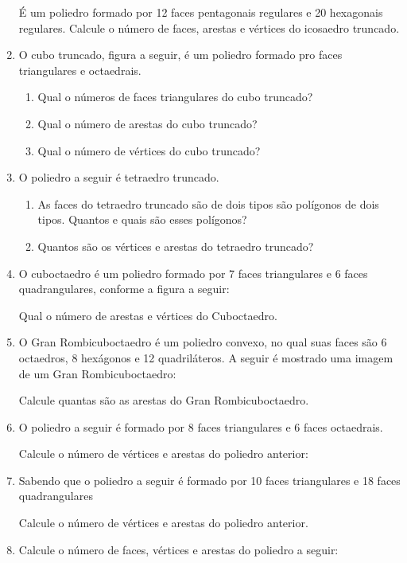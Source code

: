 \documentclass[oneside,a4paper,12pt]{article}
\begin{document}
\begin{enumerate}
É um poliedro formado por 12 faces pentagonais regulares e 20 hexagonais regulares. Calcule o número de faces, arestas e vértices do icosaedro truncado.

\item O cubo truncado, figura a seguir, é um poliedro formado pro faces triangulares e octaedrais.

\begin{enumerate}
\item Qual o números de faces triangulares do cubo truncado?
\item Qual o número de arestas do cubo truncado?
\item Qual o número de vértices do cubo truncado?
\end{enumerate}

\item O poliedro a seguir é tetraedro truncado.

\begin{enumerate}
\item As faces do tetraedro truncado são de dois tipos são polígonos de dois tipos. Quantos e quais são esses polígonos?
\item Quantos são os vértices e arestas do tetraedro truncado?
\end{enumerate}

\item O cuboctaedro é um poliedro formado por 7 faces triangulares e 6 faces quadrangulares, conforme a figura a seguir:

Qual o número de arestas e vértices do Cuboctaedro.

\item O Gran Rombicuboctaedro é um poliedro convexo, no qual suas faces são 6 octaedros, 8 hexágonos e 12 quadriláteros. A seguir é mostrado uma imagem de um Gran Rombicuboctaedro:


Calcule quantas são as arestas do Gran Rombicuboctaedro.

\item O poliedro a seguir é formado por 8 faces triangulares e 6 faces octaedrais.


Calcule o número de vértices e arestas do poliedro anterior:

\item Sabendo que o poliedro a seguir é formado por 10 faces triangulares e 18 faces quadrangulares


Calcule o número de vértices e arestas do poliedro anterior.

\item Calcule o número de faces, vértices e arestas do poliedro a seguir:


\end{enumerate}
\end{document}
